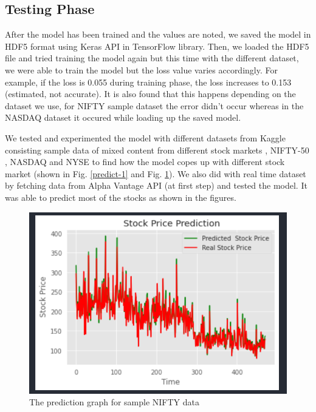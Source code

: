 \documentclass[conference]{IEEEtran}
\begin{document}
\subsection{Testing Phase}
After the model has been trained and the values are noted, we saved the model in HDF5 format using Keras API in TensorFlow library. Then, we loaded the HDF5 file and tried training the model again but this time with the different dataset, we were able to train the model but the loss value varies accordingly. For example, if the loss is 0.055 during training phase, the loss increases to 0.153 (estimated, not accurate). It is also found that this happens depending on the dataset we use, for NIFTY sample dataset the error didn't occur whereas in the NASDAQ dataset it occured while loading up the saved model.

We tested and experimented the model with different datasets from Kaggle consisting sample data of mixed content from different stock markets \cite{b10}, NIFTY-50 \cite{b11}, NASDAQ and NYSE \cite{b12} to find how the model copes up with different stock market (shown in Fig. \ref{predict-1} and Fig. \ref{predict-2}). We also did with real time dataset by fetching data from Alpha Vantage API (at first step) and tested the model. It was able to predict most of the stocks as shown in the figures.

\begin{figure}[htbp]
\centerline{\includegraphics[scale=0.7]{predict_2.png}}
\caption{The prediction graph for sample NIFTY data}
\label{predict-2}
\end{figure}
\end{document}
